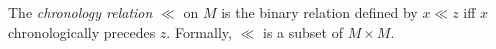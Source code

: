 The \emph{chronology relation} $\ll$ on $M$ is the binary relation defined by $x \ll z$ iff $x$ chronologically precedes $z$. Formally, $\ll$ is a subset of $M \times M$.
